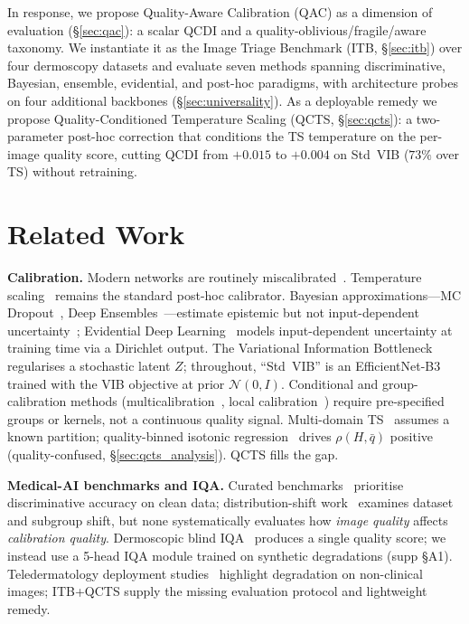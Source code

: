 \documentclass{bmvc2k}
\newcommand{\qbar}{\bar{q}}
\begin{document}
In response, we propose Quality-Aware Calibration (QAC) as a dimension of evaluation (\S\ref{sec:qac}): a scalar QCDI and a quality-oblivious/fragile/aware taxonomy. We instantiate it as the Image Triage Benchmark (ITB, \S\ref{sec:itb}) over four dermoscopy datasets and evaluate seven methods spanning discriminative, Bayesian, ensemble, evidential, and post-hoc paradigms, with architecture probes on four additional backbones (\S\ref{sec:universality}). As a deployable remedy we propose Quality-Conditioned Temperature Scaling (QCTS, \S\ref{sec:qcts}): a two-parameter post-hoc correction that conditions the TS temperature on the per-image quality score, cutting QCDI from $+0.015$ to $+0.004$ on Std~VIB ($73\%$ over TS) without retraining.

\section{Related Work}

\textbf{Calibration.}
Modern networks are routinely miscalibrated~\cite{guo2017calibration}. Temperature scaling~\cite{guo2017calibration} remains the standard post-hoc calibrator. Bayesian approximations---MC Dropout~\cite{gal2016dropout}, Deep Ensembles~\cite{lakshminarayanan2017ensemble,ovadia2019uncertainty}---estimate epistemic but not input-dependent uncertainty~\cite{malinin2019predictive}; Evidential Deep Learning~\cite{sensoy2018evidential} models input-dependent uncertainty at training time via a Dirichlet output. The Variational Information Bottleneck~\cite{alemi2017vib} regularises a stochastic latent $Z$; throughout, ``Std~VIB'' is an EfficientNet-B3 trained with the VIB objective at prior $\mathcal{N}(0,I)$. Conditional and group-calibration methods (multicalibration~\cite{hebert2018multicalibration,deng2023happymap}, local calibration~\cite{luo2023local}) require pre-specified groups or kernels, not a continuous quality signal. Multi-domain TS~\cite{yu2022robust} assumes a known partition; quality-binned isotonic regression~\cite{zadrozny2002transforming} drives $\rho(H,\qbar)$ positive (quality-confused, \S\ref{sec:qcts_analysis}). QCTS fills the gap.

\textbf{Medical-AI benchmarks and IQA.}
Curated benchmarks~\cite{irvin2019chexpert,johnson2019mimic,menze2014multimodal,codella2018skin} prioritise discriminative accuracy on clean data; distribution-shift work~\cite{koh2021wilds,subbaswamy2021evaluating,seyyed2021underdiagnosis} examines dataset and subgroup shift, but none systematically evaluates how \emph{image quality} affects \emph{calibration quality}. Dermoscopic blind IQA~\cite{barata2023quality,park2023quality} produces a single quality score; we instead use a 5-head IQA module trained on synthetic degradations (supp \S A1). Teledermatology deployment studies~\cite{esteva2017dermatologist,tschandl2020human,winkler2022dermoscopy,liu2020deep} highlight degradation on non-clinical images; ITB+QCTS supply the missing evaluation protocol and lightweight remedy.
\end{document}

